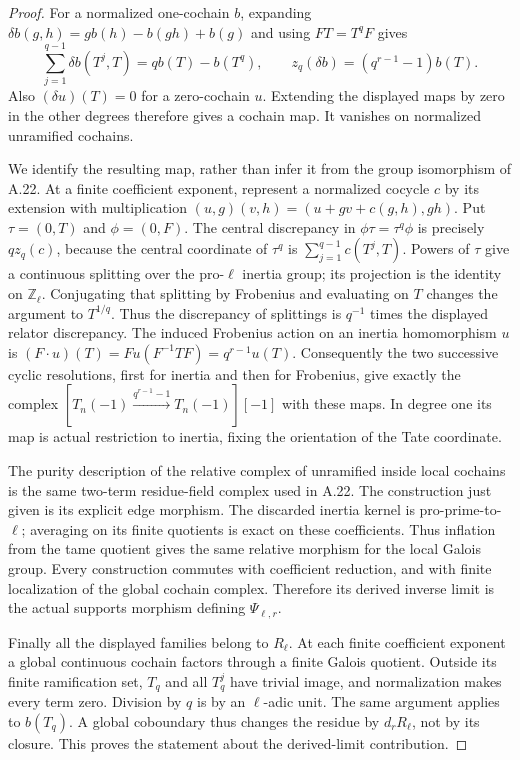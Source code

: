 \begin{proof}
For a normalized one-cochain $b$, expanding
$\delta b(g,h)=g b(h)-b(gh)+b(g)$ and using $FT=T^qF$ gives
\[
 \sum_{j=1}^{q-1}\delta b(T^j,T)=qb(T)-b(T^q),
 \qquad z_q(\delta b)=(q^{r-1}-1)b(T).
\]
Also $(\delta u)(T)=0$ for a zero-cochain $u$. Extending the
displayed maps by zero in the other degrees therefore gives a
cochain map. It vanishes on normalized unramified cochains.

We identify the resulting map, rather than infer it from the group
isomorphism of A.22. At a finite coefficient exponent, represent a
normalized cocycle $c$ by its extension with multiplication
$(u,g)(v,h)=(u+gv+c(g,h),gh)$. Put $\tau=(0,T)$ and
$\phi=(0,F)$. The central discrepancy in
$\phi\tau=\tau^q\phi$ is precisely $qz_q(c)$, because the
central coordinate of $\tau^q$ is
$\sum_{j=1}^{q-1}c(T^j,T)$. Powers of $\tau$ give a continuous
splitting over the pro-$\ell$ inertia group; its projection is the
identity on $\mathbb Z_\ell$. Conjugating that splitting by
Frobenius and evaluating on $T$ changes the argument to $T^{1/q}$.
Thus the discrepancy of splittings is $q^{-1}$ times the displayed
relator discrepancy. The induced Frobenius action on an inertia
homomorphism $u$ is
$(F\cdot u)(T)=F u(F^{-1}TF)=q^{r-1}u(T)$.
Consequently the two successive cyclic resolutions, first for
inertia and then for Frobenius, give exactly the complex
$[T_n(-1)\xrightarrow{q^{r-1}-1}T_n(-1)][-1]$ with these maps.
In degree one its map is actual restriction to inertia, fixing the
orientation of the Tate coordinate.

The purity description of the relative complex of unramified inside
local cochains is the same two-term residue-field complex used in
A.22. The construction just given is its explicit edge morphism.
The discarded inertia kernel is pro-prime-to-$\ell$; averaging on
its finite quotients is exact on these coefficients. Thus inflation
from the tame quotient gives the same relative morphism for the
local Galois group. Every construction commutes with coefficient
reduction, and with finite localization of the global cochain
complex. Therefore its derived inverse limit is the actual supports
morphism defining $\Psi_{\ell,r}$.

Finally all the displayed families belong to $R_\ell$. At each
finite coefficient exponent a global continuous cochain factors
through a finite Galois quotient. Outside its finite ramification
set, $T_q$ and all $T_q^j$ have trivial image, and normalization
makes every term zero. Division by $q$ is by an $\ell$-adic unit.
The same argument applies to $b(T_q)$. A global coboundary thus
changes the residue by $d_rR_\ell$, not by its closure. This
proves the statement about the derived-limit contribution.
\end{proof}

